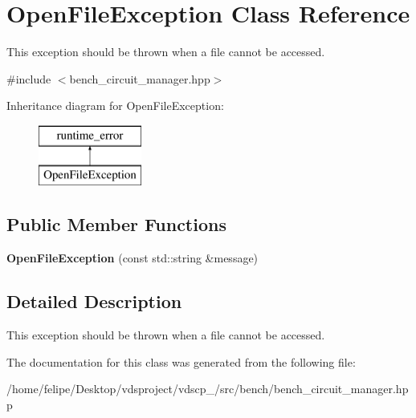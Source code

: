 \section{Open\+File\+Exception Class Reference}
\label{classOpenFileException}


This exception should be thrown when a file cannot be accessed.  




{\ttfamily \#include $<$bench\+\_\+circuit\+\_\+manager.\+hpp$>$}

Inheritance diagram for Open\+File\+Exception\+:\begin{figure}[H]
\begin{center}
\leavevmode
\includegraphics[height=2.000000cm]{classOpenFileException}
\end{center}
\end{figure}
\subsection*{Public Member Functions}
\begin{DoxyCompactItemize}
\item 
{\bfseries Open\+File\+Exception} (const std\+::string \&message)\label{classOpenFileException_a6632ca961e00571c690b071d033651e7}

\end{DoxyCompactItemize}


\subsection{Detailed Description}
This exception should be thrown when a file cannot be accessed. 

The documentation for this class was generated from the following file\+:\begin{DoxyCompactItemize}
\item 
/home/felipe/\+Desktop/vdsproject/vdscp\+\_/src/bench/bench\+\_\+circuit\+\_\+manager.\+hpp\end{DoxyCompactItemize}

